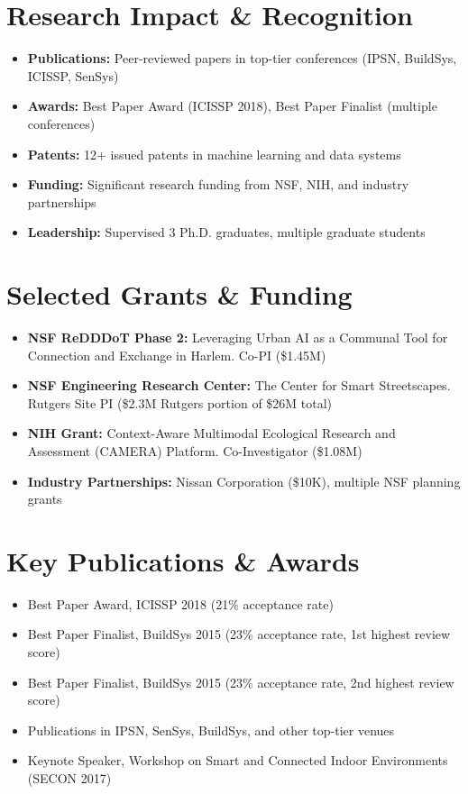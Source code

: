 \documentclass[11pt]{article}
\begin{document}
\section{Research Impact \& Recognition}
\begin{itemize}
    \item \textbf{Publications:} Peer-reviewed papers in top-tier conferences (IPSN, BuildSys, ICISSP, SenSys)
    \item \textbf{Awards:} Best Paper Award (ICISSP 2018), Best Paper Finalist (multiple conferences)
    \item \textbf{Patents:} 12+ issued patents in machine learning and data systems
    \item \textbf{Funding:} Significant research funding from NSF, NIH, and industry partnerships
    \item \textbf{Leadership:} Supervised 3 Ph.D. graduates, multiple graduate students
\end{itemize}

\section{Selected Grants \& Funding}
\begin{itemize}[topsep=1pt,itemsep=2pt]
    \item \textbf{NSF ReDDDoT Phase 2:} Leveraging Urban AI as a Communal Tool for Connection and Exchange in Harlem. Co-PI (\$1.45M)
    \item \textbf{NSF Engineering Research Center:} The Center for Smart Streetscapes. Rutgers Site PI (\$2.3M Rutgers portion of \$26M total)
    \item \textbf{NIH Grant:} Context-Aware Multimodal Ecological Research and Assessment (CAMERA) Platform. Co-Investigator (\$1.08M)
    \item \textbf{Industry Partnerships:} Nissan Corporation (\$10K), multiple NSF planning grants
\end{itemize}

\section{Key Publications \& Awards}
\begin{itemize}[topsep=1pt,itemsep=2pt]
    \item Best Paper Award, ICISSP 2018 (21\% acceptance rate)
    \item Best Paper Finalist, BuildSys 2015 (23\% acceptance rate, 1st highest review score)
    \item Best Paper Finalist, BuildSys 2015 (23\% acceptance rate, 2nd highest review score)
    \item Publications in IPSN, SenSys, BuildSys, and other top-tier venues
    \item Keynote Speaker, Workshop on Smart and Connected Indoor Environments (SECON 2017)
\end{itemize}
\end{document}

